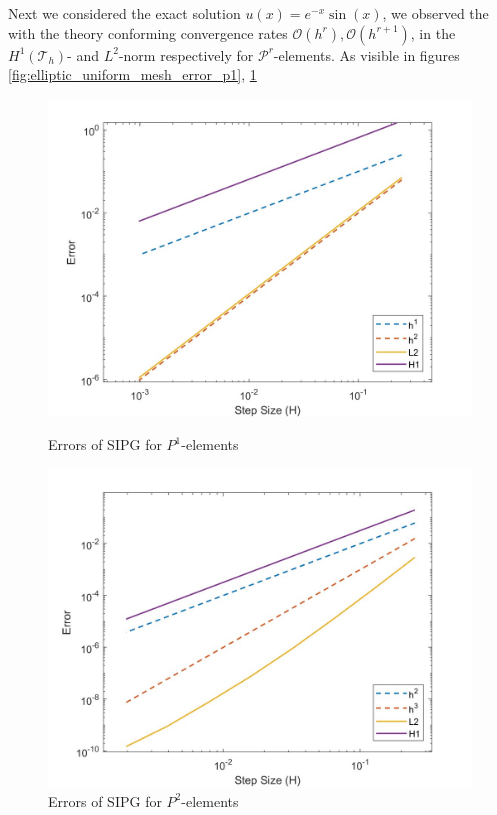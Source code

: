 Next we considered the exact solution $u(x) = e^{-x} \sin(x)$, we observed the with the theory conforming convergence rates 
$\mathcal{O}(h^r), \mathcal{O}(h^{r+1})$, in the $H^1(\mathcal{T}_h)$- and $L^2$-norm respectively for $\mathcal{P}^r$-elements. As visible in figures 
\ref{fig:elliptic_uniform_mesh_error_p1}, \ref{fig:elliptic_uniform_mesh_error_p2}

\begin{figure}[h!]
    \centering
    
    \begin{minipage}[t]{0.48\textwidth}
        \centering
        \includegraphics[width=\linewidth]{figures/dg_elliptic_uniform_mesh_exact_sol_errors_P1.jpg}
        \caption{Errors of SIPG for $P^1$-elements}
        \label{fig:elliptic_uniform_mesh_error_p1}
    \end{minipage}
    \hfill
    \begin{minipage}[t]{0.48\textwidth}
        \centering
        \includegraphics[width=\linewidth]{figures/dg_elliptic_uniform_mesh_exact_sol_errors_P2.jpg}
        \caption{Errors of SIPG for $P^2$-elements}
        \label{fig:elliptic_uniform_mesh_error_p2}
    \end{minipage}
\end{figure}

